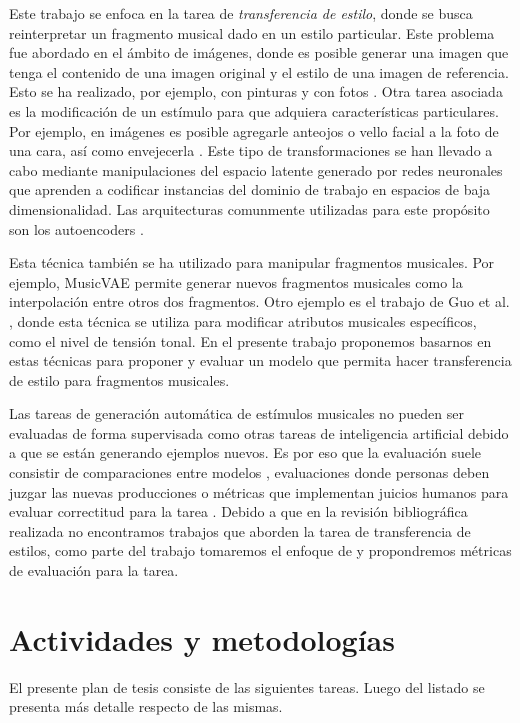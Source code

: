 \documentclass[10pt]{article}
\begin{document}
Este trabajo se enfoca en la tarea de \emph{transferencia de
estilo}, donde se busca reinterpretar un fragmento musical dado en un estilo
particular. Este problema fue abordado en el ámbito de imágenes, donde es
posible generar una imagen que tenga el contenido de una imagen original y el
estilo de una imagen de referencia. Esto se ha realizado, por ejemplo, con
pinturas \cite{gatys2015style} y con fotos \cite{luan2017photo}. Otra tarea
asociada es la modificación de un estímulo para que adquiera características
particulares. Por ejemplo, en imágenes es posible agregarle anteojos o vello
facial a la foto de una cara, así como envejecerla \cite{upchurch2016feature}.
Este tipo de transformaciones se han llevado a cabo mediante manipulaciones del
espacio latente generado por redes neuronales que aprenden a codificar
instancias del dominio de trabajo en espacios de baja dimensionalidad. Las
arquitecturas comunmente utilizadas para este propósito son los autoencoders
\cite{hou2016feature}.  

Esta técnica también se ha utilizado para manipular
fragmentos musicales. Por ejemplo, MusicVAE \cite{roberts2019musicvae} permite
generar nuevos fragmentos musicales como la interpolación entre otros dos
fragmentos. Otro ejemplo es el trabajo de Guo et al. \cite{guo2020variational},
donde esta técnica se utiliza para modificar atributos musicales específicos,
como el nivel de tensión tonal. En el presente trabajo proponemos basarnos en
estas técnicas para proponer y evaluar un modelo que permita hacer
transferencia de estilo para fragmentos musicales.

Las tareas de generación automática de estímulos musicales no pueden ser
evaluadas de forma supervisada como otras tareas de inteligencia artificial
debido a que se están generando ejemplos nuevos. Es por eso que la evaluación
suele consistir de comparaciones entre modelos \cite{Berardinis}, evaluaciones
donde personas deben juzgar las nuevas producciones \cite{hadjeres2017bach,
gatys2015style, luan2017photo} o
métricas que implementan juicios humanos para evaluar correctitud para la
tarea \cite{benetatos2020bachduet}. Debido a que en la revisión bibliográfica 
realizada no encontramos trabajos que aborden la tarea de transferencia de
estilos, como parte del trabajo tomaremos el enfoque de
\cite{benetatos2020bachduet} y propondremos métricas de evaluación para la
tarea.

\section*{Actividades y metodologías}
El presente plan de tesis consiste de las siguientes tareas. Luego del listado
se presenta más detalle respecto de las mismas.
\end{document}
